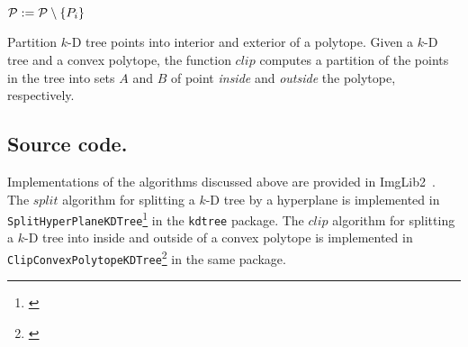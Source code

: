 \begin{algorithm}[H]
{{{        $\mathcal{P} := \mathcal{P} \setminus \left\{P_i\right\}$\;
      }
    }
        \BlankLine
        \BlankLine
  }
  \caption{Partition $k$-D tree points into interior and exterior of a polytope.
    Given a $k$-D tree and a convex polytope, the function $\mathit{clip}$ computes a partition of the points in the tree
      into sets $A$ and $B$ of point \emph{inside} and \emph{outside} the polytope, respectively.}
  \label{alg:clip}
\end{algorithm}



\subsection{Source code.}
Implementations of the algorithms discussed above are provided in ImgLib2~\cite{ImgLib2paper}.
The $\mathit{split}$ algorithm for splitting a $k$-D tree by a hyperplane is implemented in \texttt{SplitHyperPlaneKDTree}\footnote{\href{https://github.com/imglib/imglib2-algorithm/blob/master/src/main/java/net/imglib2/algorithm/kdtree/SplitHyperPlaneKDTree.java}{}} in the \texttt{kdtree} package.
The $\mathit{clip}$ algorithm for splitting a $k$-D tree into inside and outside of a convex polytope is implemented in \texttt{ClipConvexPolytopeKDTree}\footnote{
\href{https://github.com/imglib/imglib2-algorithm/blob/master/src/main/java/net/imglib2/algorithm/kdtree/ClipConvexPolytopeKDTree.java}{}} in the same package.

